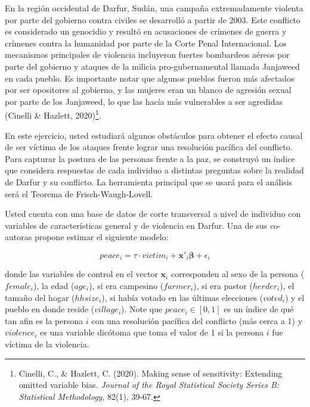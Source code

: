 \documentclass[a4paper, answers, addpoints, 11pt]{exam}
\begin{document}
\normalsize\bigskip En la región occidental de Darfur, Sudán, una campaña extremadamente violenta por parte del gobierno contra civiles se desarrolló a partir de 2003. Este conflicto es considerado un genocidio y resultó en acusaciones de crímenes de guerra y crímenes contra la humanidad por parte de la Corte Penal Internacional. Los mecanismos principales de violencia incluyeron fuertes bombardeos aéreos por parte del gobierno y ataques de la milicia pro-gubernamental llamada Janjaweed en cada pueblo. Es importante notar que algunos pueblos fueron más afectados por ser opositores al gobierno, y las mujeres eran un blanco de agresión sexual por parte de los Janjaweed, lo que las hacía más vulnerables a ser agredidas (Cinelli \& Hazlett, 2020)\footnote{Cinelli, C., \& Hazlett, C. (2020). Making sense of sensitivity: Extending omitted variable bias. \textit{Journal of the Royal Statistical Society Series B: Statistical Methodology}, 82(1), 39-67.
}.

\bigskip En este ejercicio, usted estudiará algunos obstáculos para obtener el efecto causal de ser víctima de los ataques frente lograr una resolución pacífica del conflicto. Para capturar la postura de las personas frente a la paz, se construyó un índice que considera respuestas de cada individuo a distintas preguntas sobre la realidad de Darfur y su conflicto. La herramienta principal que se usará para el análisis será el Teorema de Frisch-Waugh-Lovell.

Usted cuenta con una base de datos de corte transversal a nivel de individuo con variables de características general y de violencia en Darfur. Una de sus co-autoras propone estimar el siguiente modelo:

\begin{equation}\label{eq:no_z}
    peace_i = \tau \cdot victim_i + \textbf{x}'_i\boldsymbol\beta + \epsilon_i
\end{equation}

    donde las variables de control en el vector $\textbf{x}_i$ corresponden al sexo de la persona ($female_i$), la edad ($age_i$), si era campesino ($farmer_i$), si era pastor ($herder_i$), el tamaño del hogar ($hhsize_i$), si había votado en las últimas elecciones ($voted_i$) y el pueblo en donde reside ($village_i$). Note que $peace_i \in [0,1]$ es un índice de qué tan afin es la persona $i$ con una resolución pacífica del conflicto (más cerca a 1) y $violence_i$ es una variable dicótoma que toma el valor de 1 si la persona $i$ fue víctima de la violencia.
\end{document}
